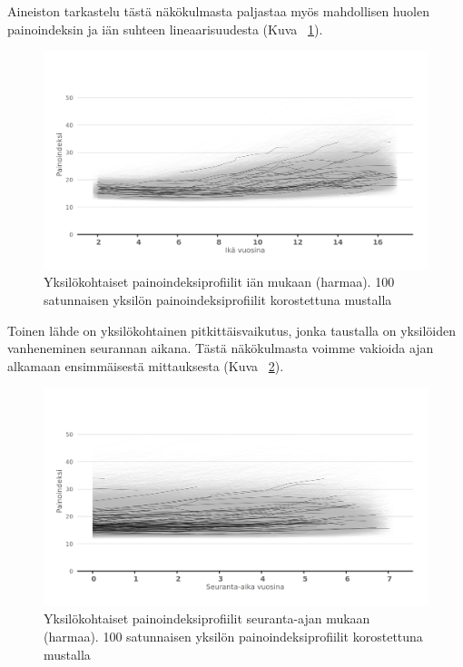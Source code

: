\documentclass[finnish]{docopts}
\begin{document}
Aineiston tarkastelu tästä näkökulmasta paljastaa myös mahdollisen huolen painoindeksin ja iän suhteen lineaarisuudesta (Kuva ~\ref{fig:bmi_age}).\\

\begin{figure}[H]
\centering
  \includegraphics[scale=0.8]{kuvaajat/bmi_age.png}
  \caption{Yksilökohtaiset painoindeksiprofiilit iän mukaan (harmaa). 100 satunnaisen yksilön painoindeksiprofiilit korostettuna mustalla}
  \label{fig:bmi_age}
\end{figure}


Toinen lähde on yksilökohtainen pitkittäisvaikutus, jonka taustalla on yksilöiden vanheneminen seurannan aikana. Tästä näkökulmasta voimme vakioida ajan alkamaan ensimmäisestä mittauksesta (Kuva ~\ref{fig:bmi_follow}).\\

\begin{figure}[H]
\centering
  \includegraphics[scale=0.8]{kuvaajat/bmi_follow.png}
  \caption{Yksilökohtaiset painoindeksiprofiilit seuranta-ajan mukaan (harmaa). 100 satunnaisen yksilön painoindeksiprofiilit korostettuna mustalla}
  \label{fig:bmi_follow}
\end{figure}
\end{document}
